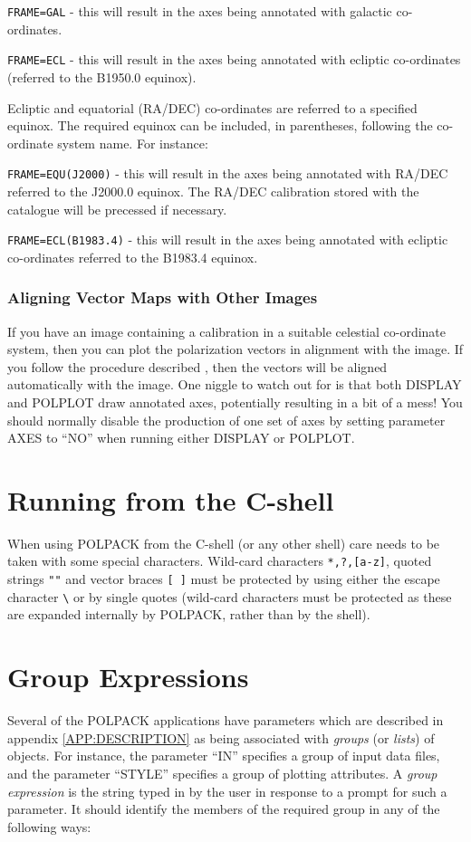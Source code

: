 \documentclass[twoside,11pt]{starlink}
\begin{document}
\verb+FRAME=GAL+ - this will result in the axes being annotated with
galactic co-ordinates.

\verb+FRAME=ECL+ - this will result in the axes being annotated with
ecliptic co-ordinates (referred to the B1950.0 equinox).

Ecliptic and equatorial (RA/DEC) co-ordinates are referred to a specified
equinox. The required equinox can be included, in parentheses, following the
co-ordinate system name. For instance:

\verb+FRAME=EQU(J2000)+ - this will result in the axes being annotated with
RA/DEC referred to the J2000.0 equinox. The RA/DEC calibration stored
with the catalogue will be precessed if necessary.

\verb+FRAME=ECL(B1983.4)+ - this will result in the axes being annotated with
ecliptic co-ordinates referred to the B1983.4 equinox.

\subsubsection {Aligning Vector Maps with Other Images}
If you have an image containing a
calibration in a suitable celestial co-ordinate system, then you can plot
the polarization vectors in alignment with the image. If you follow the
procedure described , then the
vectors will be aligned automatically with the image. One niggle to watch
out for is that both DISPLAY and POLPLOT draw annotated axes, potentially
resulting in a bit of a mess! You should normally disable the production of
one set of axes by setting parameter AXES to ``NO'' when running either
DISPLAY or POLPLOT.

\section{Running from the C-shell}
When using POLPACK from the C-shell (or any other shell) care needs to be
taken with some special characters. Wild-card characters \texttt{*,?,[a-z]},
quoted strings \texttt{""} and vector braces \texttt{[ ]} must be protected
by using either the escape character {\small \verb+\+} or by single
quotes (wild-card characters must be protected as these are expanded
internally by POLPACK, rather than by the shell).

\section{\label{SEC:GRPEXP}Group Expressions}
Several of the POLPACK applications have parameters which are described
in appendix \ref{APP:DESCRIPTION} as being associated with
\emph{groups} (or \emph{lists}) of objects. For instance, the
 parameter ``IN'' specifies a group of input data
files, and the  parameter ``STYLE'' specifies a
group of plotting attributes. A \emph{group expression} is the string
typed in by the user in response to a prompt for such a parameter. It
should identify the members of the required group in any of the following
ways:
\end{document}
